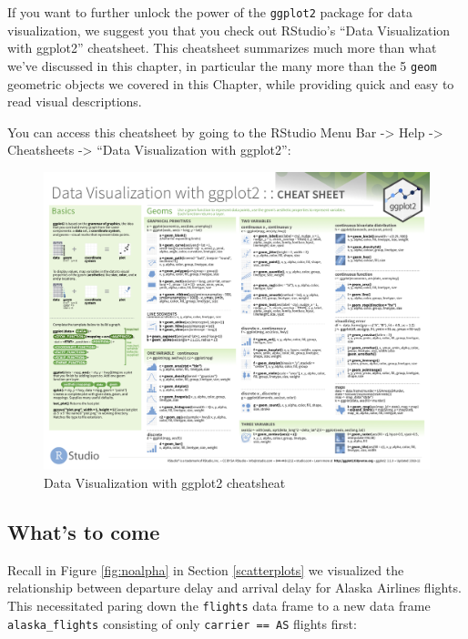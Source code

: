 \documentclass[12pt, krantz2,]{krantz}
\begin{document}
If you want to further unlock the power of the \texttt{ggplot2} package for data visualization, we suggest you that you check out RStudio's ``Data Visualization with ggplot2'' cheatsheet. This cheatsheet summarizes much more than what we've discussed in this chapter, in particular the many more than the 5 \texttt{geom} geometric objects we covered in this Chapter, while providing quick and easy to read visual descriptions.

You can access this cheatsheet by going to the RStudio Menu Bar -\textgreater{} Help -\textgreater{} Cheatsheets -\textgreater{} ``Data Visualization with ggplot2'':

\begin{figure}

{\centering \includegraphics[width=\textwidth]{images/ggplot_cheatsheet-1} 

}

\caption{Data Visualization with ggplot2 cheatsheat}\label{fig:ggplot-cheatsheet}
\end{figure}

\hypertarget{whats-to-come-3}{%
\subsection{What's to come}\label{whats-to-come-3}}

Recall in Figure \ref{fig:noalpha} in Section \ref{scatterplots} we visualized the relationship between departure delay and arrival delay for Alaska Airlines flights. This necessitated paring down the \texttt{flights} data frame to a new data frame \texttt{alaska\_flights} consisting of only \texttt{carrier\ ==\ AS} flights first:
\end{document}
